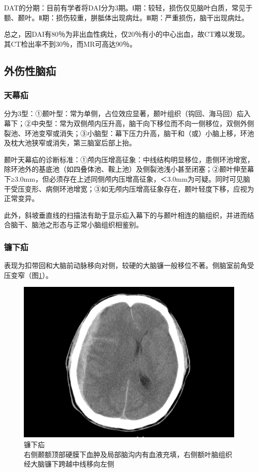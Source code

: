 DAT的分期：目前有学者将DAI分为3期。Ⅰ期：较轻，损伤仅见脑叶白质，常见于额、颞叶。Ⅱ期：损伤较重，胼胝体出现病灶。Ⅲ期：严重损伤，脑干出现病灶。

总之，因DAI有80％为非出血性病灶，仅20％有小的中心出血，故CT难以发现。其CT检出率不到30％，而MR可高达90％。

\subsection{外伤性脑疝}

\subsubsection{天幕疝}

分为3型：①颞叶型：常为单侧，占位效应显著，颞叶组织（钩回、海马回）疝入幕下；②中央型：常为双侧颅内压升高，脑干向下移位而不向一侧移位，双侧外侧裂池、环池变窄或消失；③小脑型：幕下压力升高，脑干和（或）小脑上移，环池及枕大池狭窄或消失，第三脑室后部上抬。

颞叶天幕疝的诊断标准：①颅内压增高征象：中线结构明显移位，患侧环池增宽，除环池外的基底池（如四叠体池、鞍上池）及侧裂池浅小甚至闭塞；②颞叶伸至幕下≥3.0mm，但必须存在上述同侧颅内压增高征象，＜3.0mm为可疑。同时可见脑干受压变形、病侧环池增宽；③如无颅内压增高征象存在，颞叶轻度下移，应视为正常变异。

此外，斜坡垂直线的扫描法有助于显示疝入幕下的与颞叶相连的脑组织，并进而结合脑干、脑池之形态与正常小脑组织相鉴别。

\subsubsection{镰下疝}

表现为扣带回和大脑前动脉移向对侧，较硬的大脑镰一般移位不著。侧脑室前角受压变窄（图\ref{fig2-35}）。

\begin{figure}[!htbp]
 \centering
 \includegraphics[width=.7\textwidth,height=\textheight,keepaspectratio]{./images/Image00056.jpg}
 \captionsetup{justification=centering}
 \caption{镰下疝\\{\small 右侧颞额顶部硬膜下血肿及局部脑沟内有血液充填，右侧额叶脑组织经大脑镰下跨越中线移向左侧}}
 \label{fig2-35}
  \end{figure} 

